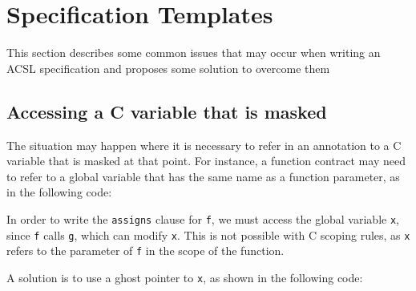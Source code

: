 \section{Specification Templates}\label{sec:spec-templ}
This section describes some common issues that may occur when writing
an ACSL specification and proposes some solution to overcome them

\subsection{Accessing a C variable that is masked}

The situation may happen where it is necessary to refer
in an annotation to a C variable that is masked at that point.
For instance, 
a function contract may need to refer to a global variable that has the
same name as a function parameter, as in the following code:



In order to write the \verb|assigns| clause for \verb|f|, we must
access the global variable \verb|x|, since \verb|f| calls \verb|g|,
which can modify \verb|x|. This is not possible with C scoping rules,
as \verb|x| refers to the parameter of \verb|f| in the scope of the
function.

A solution is to use a ghost pointer to \verb|x|, as shown in
the following code:




